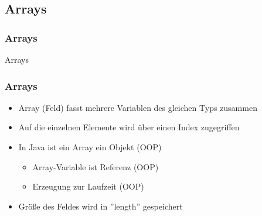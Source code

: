 \subsection{Arrays}
\begin{frame}[fragile]
	\frametitle{Arrays}
	\huge Arrays
\end{frame}

\begin{frame}
	\frametitle{Arrays}
	\begin{itemize}
	  \item Array (Feld) fasst mehrere Variablen des gleichen Typs zusammen
	  \item Auf die einzelnen Elemente wird über einen Index zugegriffen
	  \item In Java ist ein Array ein Objekt (OOP)
	  		\begin{itemize}
	  		  \item Array-Variable ist Referenz (OOP)
	  		  \item Erzeugung zur Laufzeit (OOP)
	  		\end{itemize}
	  \item Größe des Feldes wird in ''length'' gespeichert
	\end{itemize}
\end{frame}

